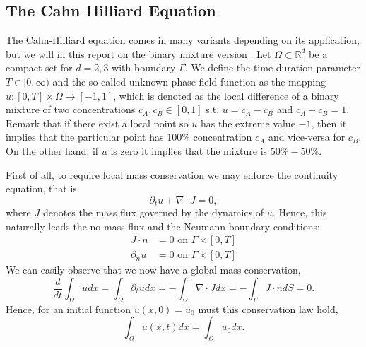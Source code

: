 \subsection{The Cahn Hilliard Equation}%
\label{sub:the_equations}

The Cahn-Hilliard equation comes in many variants depending on its application, but we will in this report on the binary mixture version \cite{miranville2017cahn}. Let $\Omega \subset  \mathbb{R} ^{d} $ be a compact set for $d=2,3$ with boundary
$\Gamma $. We define the time duration parameter $T \in  [0,\infty) $ and the
so-called unknown phase-field function as the
mapping $u: \left[ 0,T \right] \times \Omega  \to \left[ -1,1 \right]  $, which is denoted as the local difference of a binary mixture of two concentrations $c_{A}, c_{B} \in \left[ 0,1\right] $ s.t. $u = c_{A} -c_{B}$ and $c_{A} + c_{B} = 1$. Remark that if there exist a
local point so $u$ has the extreme value $-1$, then it implies that the particular point has $100\%$ concentration $c_{A}$ and vice-versa for $c_{B}$. On the other hand, if $u$ is zero it implies that the mixture is $50\% - 50\%$.

First of all, to require local mass conservation we may enforce the continuity equation, that is \[
\partial _{t} u + \nabla \cdot J = 0,
\]
where $J$ denotes the mass flux governed by the dynamics of $u$. Hence, this naturally leads the no-mass flux and the Neumann boundary conditions:
\begin{equation}
\label{eq:conservation}
    \begin{split}
J \cdot n & = 0 \text{ on } \Gamma \times \left[ 0,T \right]\\
\partial _{n} u & = 0 \text{ on } \Gamma \times \left[ 0,T \right]
    \end{split}
\end{equation}
We can easily observe that we now have a global mass conservation, \[
\frac{d}{dt} \int_{\Omega }^{} u dx = \int_{\Omega }^{}  \partial _{t} u dx=  -\int_{\Omega   }^{} \nabla \cdot J   dx   =  -\int_{\Gamma  }^{} J \cdot n    dS  = 0.
\]
Hence, for an initial function $ u( x,0) =  u_{0}$ must this conservation law hold, \[
\int_{\Omega }^{} u ( x,t)  dx = \int_{\Omega }^{} u_{0} dx.
\]

